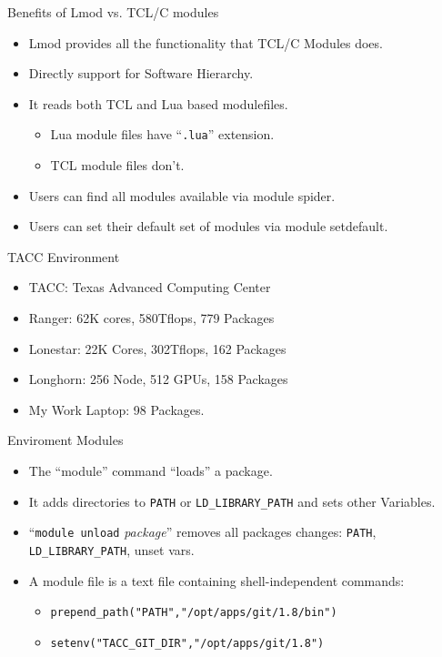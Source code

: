 \documentclass{beamer}
\begin{document}
\begin{frame}{Benefits of Lmod vs. TCL/C modules}

  \begin{itemize}
    \item Lmod provides all the functionality that TCL/C Modules does.
    \item Directly support for Software Hierarchy.
    \item It reads both TCL and Lua based modulefiles.
      \begin{itemize}
        \item Lua module files have ``\texttt{.lua}'' extension.
        \item TCL module files don't.
      \end{itemize}
    \item Users can find all modules available via {\color{blue}module spider}.
    \item Users can set their default set of modules via
      {\color{blue}module  setdefault}.
  \end{itemize}
\end{frame}



\begin{frame}{TACC Environment}
  \begin{itemize}
    \item TACC: Texas Advanced Computing Center
    \item Ranger: 62K cores, 580Tflops, 779 Packages
    \item Lonestar: 22K Cores, 302Tflops, 162 Packages
    \item Longhorn: 256 Node, 512 GPUs, 158 Packages
    \item My Work Laptop: 98 Packages.
  \end{itemize}
\end{frame}

\begin{frame}{Enviroment Modules}
  \begin{itemize}
    \item The ``module'' command ``loads'' a package.
    \item It adds directories to \texttt{PATH} or \texttt{LD\_LIBRARY\_PATH} and
      sets other  Variables. 
    \item ``\texttt{module unload} \emph{package}'' removes all packages
      changes: \texttt{PATH}, \texttt{LD\_LIBRARY\_PATH}, unset vars.
    \item A module file is a text file containing shell-independent commands:
      \begin{itemize}
        \item \texttt{prepend\_path("PATH","/opt/apps/git/1.8/bin")}
        \item \texttt{setenv("TACC\_GIT\_DIR","/opt/apps/git/1.8")}
      \end{itemize}
  \end{itemize}
\end{frame}
\end{document}
